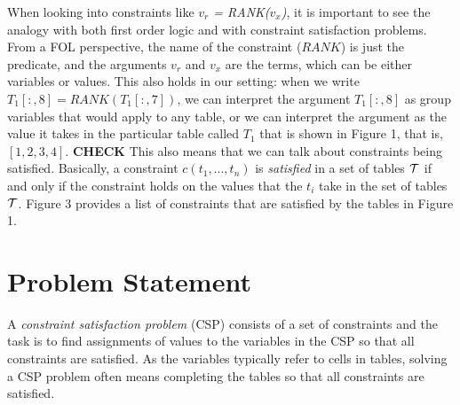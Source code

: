 \documentclass{ecai}
\newcommand{\sergey}[1]{\textcolor{magenta}{{\sc Sergey:} #1}\xspace}
\newcommand{\range}[3]{\ensuremath{#1[#2,#3]}}
\newcommand{\rangeall}{:}
\newcommand{\eccalc}[2]{\ensuremath{#1 = #2}}
\newcommand{\ecrank}[2]{\eccalc{#1}{\mathit{RANK}(#2)}}
\begin{document}
When looking into constraints like \textit{$v_r$ = RANK($v_x$)}, it is important to see the analogy with both first order logic and with constraint satisfaction problems.
From a FOL perspective, the name of the constraint ($RANK$) is just the predicate, and the arguments $v_r$ and $v_x$ are the terms, which can be either variables or values.
This also holds in our setting: when we write
      $\ecrank{\range{T_{1}}{\rangeall}{8}}{\range{T_{1}}{\rangeall}{7}}$,
we can interpret the argument ${\range{T_{1}}{\rangeall}{8}}$ as group variables that would apply to any table,
or we can interpret the argument as the value it takes in the particular table called $T_1$ that is shown in Figure 1, that is, $[1,2,3,4]$. {\bf CHECK}
This also means that we can talk about constraints being satisfied. Basically, a constraint $c(t_1, ..., t_n)$ is {\em satisfied}  in a set of tables ${\cal T}$ if and only
if the constraint holds on the values that the $t_i$ take in the set of tables ${\cal T}$. Figure 3 provides a list of constraints that are satisfied by the tables
in Figure 1.




\section{Problem Statement}
A {\em constraint satisfaction problem} (CSP) consists of a set of constraints and the
task is to find assignments of values to the variables in the CSP so that all constraints are satisfied.  As the variables typically refer to
cells in tables, solving a CSP problem often means completing the tables so that all constraints are satisfied.
\end{document}
